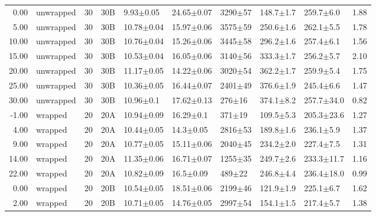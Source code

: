 \begin{table}
\begin{tabular}{rlrllllllr}
      0.00 &     unwrapped &      30 &     30B &        9.93$\pm$0.05 &   24.65$\pm$0.07 &  3290$\pm$57 &   148.7$\pm$1.7 &   259.7$\pm$6.0 &        1.88 \\
      5.00 &     unwrapped &      30 &     30B &       10.78$\pm$0.04 &   15.97$\pm$0.06 &  3575$\pm$59 &   250.6$\pm$1.6 &   262.1$\pm$5.5 &        1.78 \\
     10.00 &     unwrapped &      30 &     30B &       10.76$\pm$0.04 &   15.26$\pm$0.06 &  3445$\pm$58 &   296.2$\pm$1.6 &   257.4$\pm$6.1 &        1.56 \\
     15.00 &     unwrapped &      30 &     30B &       10.53$\pm$0.04 &   16.05$\pm$0.06 &  3140$\pm$56 &   333.3$\pm$1.7 &   256.2$\pm$5.7 &        2.10 \\
     20.00 &     unwrapped &      30 &     30B &       11.17$\pm$0.05 &   14.22$\pm$0.06 &  3020$\pm$54 &   362.2$\pm$1.7 &   259.9$\pm$5.4 &        1.75 \\
     25.00 &     unwrapped &      30 &     30B &       10.36$\pm$0.05 &   16.44$\pm$0.07 &  2401$\pm$49 &   376.6$\pm$1.9 &   245.4$\pm$6.6 &        1.47 \\
     30.00 &     unwrapped &      30 &     30B &        10.96$\pm$0.1 &   17.62$\pm$0.13 &   276$\pm$16 &   374.1$\pm$8.2 &  257.7$\pm$34.0 &        0.82 \\
     -1.00 &       wrapped &      20 &     20A &       10.94$\pm$0.09 &    16.29$\pm$0.1 &   371$\pm$19 &   109.5$\pm$5.3 &  205.3$\pm$23.6 &        1.27 \\
      4.00 &       wrapped &      20 &     20A &       10.44$\pm$0.05 &    14.3$\pm$0.05 &  2816$\pm$53 &   189.8$\pm$1.6 &   236.1$\pm$5.9 &        1.37 \\
      9.00 &       wrapped &      20 &     20A &       10.77$\pm$0.05 &   15.11$\pm$0.06 &  2040$\pm$45 &   234.2$\pm$2.0 &   227.4$\pm$7.5 &        1.31 \\
     14.00 &       wrapped &      20 &     20A &       11.35$\pm$0.06 &   16.71$\pm$0.07 &  1255$\pm$35 &   249.7$\pm$2.6 &  233.3$\pm$11.7 &        1.16 \\
     22.00 &       wrapped &      20 &     20A &       10.82$\pm$0.09 &    16.5$\pm$0.09 &   489$\pm$22 &   246.8$\pm$4.4 &  236.4$\pm$18.0 &        0.99 \\
      0.00 &       wrapped &      20 &     20B &       10.54$\pm$0.05 &   18.51$\pm$0.06 &  2199$\pm$46 &   121.9$\pm$1.9 &   225.1$\pm$6.7 &        1.62 \\
      2.00 &       wrapped &      20 &     20B &       10.71$\pm$0.05 &   14.76$\pm$0.05 &  2997$\pm$54 &   154.1$\pm$1.5 &   217.4$\pm$5.7 &        1.38 \\

\end{tabular}
\end{table}
